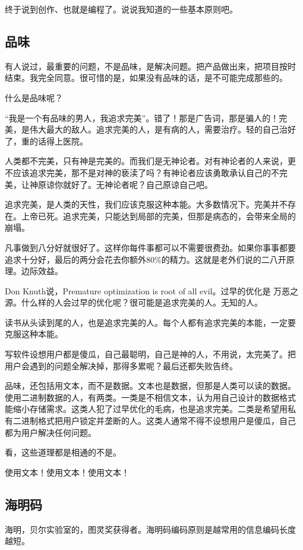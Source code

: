 \documentclass[10pt]{article}
\begin{document}
\begin{CJK*}{UTF8}{simsun}
终于说到创作、也就是编程了。说说我知道的一些基本原则吧。

\subsection{品味}

有人说过，最重要的问题，不是品味，是解决问题。把产品做出来，把项目按时
结束。我完全同意。很可惜的是，如果没有品味的话，是不可能完成那些的。

什么是品味呢？

“我是一个有品味的男人，我追求完美”。错了！那是广告词，那是骗人的！完
美，是伟大最大的敌人。追求完美的人，是有病的人，需要治疗。轻的自己治好
了，重的话得上医院。

人类都不完美，只有神是完美的。而我们是无神论者。对有神论者的人来说，更
不应该追求完美，那不是对神的亵渎了吗？有神论者应该勇敢承认自己的不完
美，让神原谅你就好了。无神论者呢？自己原谅自己吧。

追求完美，是人类的天性，我们应该克服这种本能。大多数情况下。完美并不存
在。上帝已死。追求完美，只能达到局部的完美，但那是病态的，会带来全局的
崩塌。

凡事做到八分好就很好了。这样你每件事都可以不需要很费劲。如果你事事都要
追求十分好，最后的两分会花去你额外80\%的精力。这就是老外们说的二八开原
理。边际效益。

Don Knuth说，Premature optimization is root of all evil。过早的优化是
万恶之源。什么样的人会过早的优化呢？很可能是追求完美的人。无知的人。

读书从头读到尾的人，也是追求完美的人。每个人都有追求完美的本能，一定要
克服这种本能。

写软件设想用户都是傻瓜，自己最聪明，自己是神的人，不用说，太完美了。把
用户会遇到的问题全解决掉，那得多累呢？最后还都失败告终。

品味，还包括用文本，而不是数据。文本也是数据，但那是人类可以读的数据。
使用二进制数据的人，有两类。一类是不相信文本，认为用自己设计的数据格式
能缩小存储需求。这类人犯了过早优化的毛病，也是追求完美。二类是希望用私
有二进制格式把用户锁定并垄断的人。这类人通常不得不设想用户是傻瓜，自己
都为用户解决任何问题。

看，这些道理都是相通的不是。

使用文本！使用文本！使用文本！

\subsection{海明码}

海明，贝尔实验室的，图灵奖获得者。海明码编码原则是越常用的信息编码长度
越短。


\end{CJK*}
\end{document}

